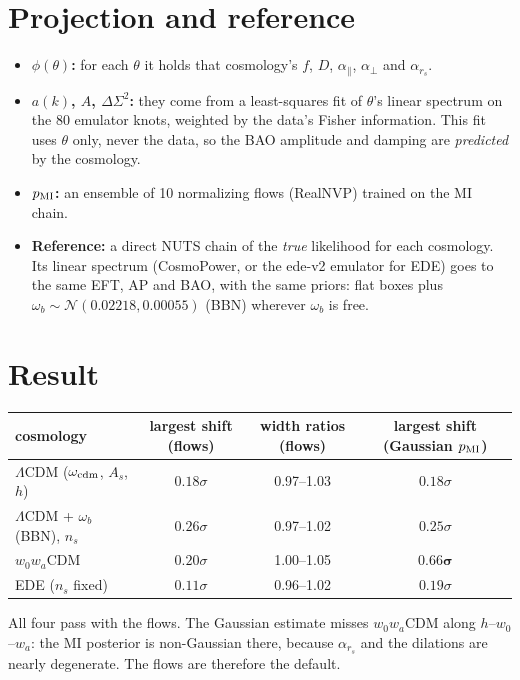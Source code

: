 \documentclass[11pt]{article}
\begin{document}
\section*{Projection and reference}
\begin{itemize}\itemsep1pt
\item \textbf{$\phi(\theta)$:} for each $\theta$ it holds that cosmology's $f$, $D$, $\alpha_\parallel$, $\alpha_\perp$ and
  $\alpha_{r_s}$.
\item \textbf{$a(k)$, $A$, $\Delta\Sigma^2$:} they come from a least-squares fit of $\theta$'s linear spectrum on the 80
  emulator knots, weighted by the data's Fisher information. This fit uses $\theta$ only, never the data, so the BAO
  amplitude and damping are \emph{predicted} by the cosmology.
\item \textbf{$p_{\rm MI}$:} an ensemble of 10 normalizing flows (RealNVP) trained on the MI chain.
\item \textbf{Reference:} a direct NUTS chain of the \emph{true} likelihood for each cosmology. Its linear spectrum
  (CosmoPower, or the ede-v2 emulator for EDE) goes to the same EFT, AP and BAO, with the same priors: flat boxes plus
  $\omega_b\sim\mathcal N(0.02218,0.00055)$ (BBN) wherever $\omega_b$ is free.
\end{itemize}

\clearpage
\section*{Result}
\begin{center}
\begin{tabular}{@{}lccc@{}}
\toprule
cosmology & largest shift (flows) & width ratios (flows) & largest shift (Gaussian $p_{\rm MI}$) \\
\midrule
$\Lambda$CDM ($\omega_{\rm cdm}$, $A_s$, $h$) & $0.18\sigma$ & 0.97--1.03 & $0.18\sigma$ \\
$\Lambda$CDM + $\omega_b$ (BBN), $n_s$ & $0.26\sigma$ & 0.97--1.02 & $0.25\sigma$ \\
$w_0w_a$CDM & $0.20\sigma$ & 1.00--1.05 & $\mathbf{0.66\sigma}$ \\
EDE ($n_s$ fixed) & $0.11\sigma$ & 0.96--1.02 & $0.19\sigma$ \\
\bottomrule
\end{tabular}
\end{center}
All four pass with the flows. The Gaussian estimate misses $w_0w_a$CDM along $h$--$w_0$--$w_a$: the MI posterior is
non-Gaussian there, because $\alpha_{r_s}$ and the dilations are nearly degenerate. The flows are therefore the default.
\end{document}
